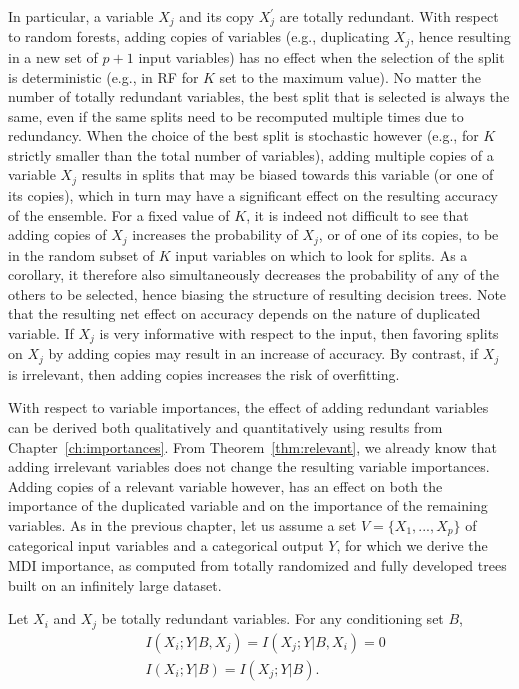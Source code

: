 In particular, a variable $X_j$ and its copy $X_j^\prime$ are totally
redundant. With respect to random forests, adding copies of variables (e.g.,
duplicating $X_j$, hence resulting in a new set of $p+1$ input variables) has
no effect when the selection of the split is deterministic (e.g., in RF for $K$
set to the maximum value). No matter the number of totally redundant variables,
the best split that is selected is always the same, even if the same splits
need to be recomputed multiple times due to redundancy. When the choice of the
best split is stochastic however (e.g., for $K$ strictly smaller than the total number
of variables), adding multiple copies of a variable $X_j$ results in
splits that may be biased towards this variable (or one of its copies), which
in turn may have a significant effect on the resulting accuracy of the
ensemble. For a fixed value of $K$, it is indeed not difficult to see that
adding copies of $X_j$ increases the probability of $X_j$, or of one of its
copies, to be in the random subset of $K$ input variables on which to look for
splits. As a corollary, it therefore also simultaneously decreases the
probability of any of the others to be selected, hence biasing
the structure of resulting decision trees. Note that the resulting net effect
on accuracy depends on the nature of duplicated variable. If $X_j$ is very
informative with respect to the input, then favoring splits on $X_j$ by
adding copies may result in an increase of accuracy. By contrast, if $X_j$
is irrelevant, then adding  copies increases the risk of overfitting.

With respect to variable importances, the effect of adding redundant variables
can be derived both qualitatively and quantitatively using results from
Chapter~\ref{ch:importances}. From Theorem~\ref{thm:relevant}, we already know
that adding irrelevant variables does not change the resulting variable
importances. Adding copies of a relevant variable however, has an effect on
both the importance of the duplicated variable and on the importance of the
remaining variables. As in the previous chapter, let us assume a set $V= \{X_1,
..., X_p\}$  of categorical input variables and a categorical output $Y$, for
which we derive the MDI importance, as computed from totally randomized and
fully developed trees built on an infinitely large dataset.

\begin{lemma}\label{lemma:red1}
Let $X_i$ and $X_j$ be totally redundant variables. For any conditioning set
$B$,
\begin{align}
& I(X_i;Y|B,X_j) = I(X_j;Y|B, X_i) = 0 \label{lemma:red1:eqn1} \\
& I(X_i;Y|B) = I(X_j;Y|B) \label{lemma:red1:eqn2}.
\end{align}
\end{lemma}

